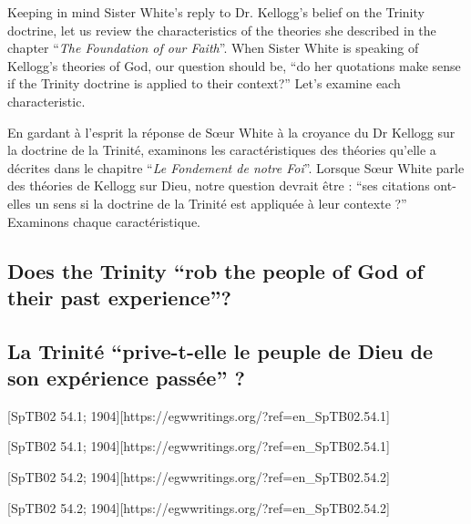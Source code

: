 Keeping in mind Sister White’s reply to Dr. Kellogg's belief on the Trinity doctrine, let us review the characteristics of the theories she described in the chapter “\textit{The Foundation of our Faith}”. When Sister White is speaking of Kellogg’s theories of God, our question should be, “do her quotations make sense if the Trinity doctrine is applied to their context?” Let’s examine each characteristic.


En gardant à l'esprit la réponse de Sœur White à la croyance du Dr Kellogg sur la doctrine de la Trinité, examinons les caractéristiques des théories qu'elle a décrites dans le chapitre “\textit{Le Fondement de notre Foi}”. Lorsque Sœur White parle des théories de Kellogg sur Dieu, notre question devrait être : “ses citations ont-elles un sens si la doctrine de la Trinité est appliquée à leur contexte ?” Examinons chaque caractéristique.


\subsection*{Does the Trinity “rob the people of God of their past experience”?}


\subsection*{La Trinité “prive-t-elle le peuple de Dieu de son expérience passée” ?}


[SpTB02 54.1; 1904][https://egwwritings.org/?ref=en\_SpTB02.54.1]


[SpTB02 54.1; 1904][https://egwwritings.org/?ref=en\_SpTB02.54.1]


[SpTB02 54.2; 1904][https://egwwritings.org/?ref=en\_SpTB02.54.2]


[SpTB02 54.2; 1904][https://egwwritings.org/?ref=en\_SpTB02.54.2]


